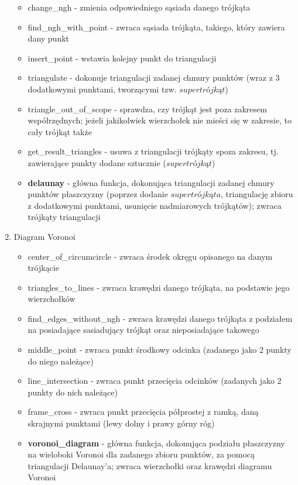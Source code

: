 \documentclass{article}
\begin{document}
\begin{enumerate}
\begin{itemize}
        \item change\_ngh - zmienia odpowiedniego sąsiada danego trójkąta
        \item find\_ngh\_with\_point - zwraca sąsiada trójkąta, takiego, który zawiera dany punkt 
        \item insert\_point - wstawia kolejny punkt do triangulacji
        \item triangulate - dokonuje triangulacji zadanej chmury punktów (wraz z 3 dodatkowymi punktami, tworzącymi tzw. $supertrójkąt$)
        \item triangle\_out\_of\_scope - sprawdza, czy trójkąt jest poza zakresem współrzędnych; jeżeli jakikolwiek wierzchołek nie mieści się w zakresie, to cały trójkąt także
        \item get\_result\_triangles - usuwa z triangulacji trójkąty spoza zakresu, tj. zawierające punkty dodane sztucznie ($supertrójkąt$)
        \item \textbf{delaunay} - główna funkcja, dokonująca triangulacji zadanej chmury punktów płaszczyzny (poprzez dodanie $supertrójkąta$, triangulację zbioru z dodatkowymi punktami, usunięcie nadmiarowych trójkątów); zwraca trójkąty triangulacji
    \end{itemize}
    
    \item Diagram Voronoi
        \begin{itemize}
            \item center\_of\_circumcircle - zwraca środek okręgu opisanego na danym trójkącie
            \item triangles\_to\_lines - zwraca krawędzi danego trójkąta, na podstawie jego wierzchołków
            \item find\_edges\_without\_ngh - zwraca krawędzi danego trójkąta z podziałem na posiadające sasiadujący trójkąt oraz nieposiadające takowego
            \item middle\_point - zwraca punkt środkowy odcinka (zadanego jako 2 punkty do niego należące)
            \item line\_intersection - zwraca punkt przecięcia odcinków (zadanych jako 2 punkty do nich należące)
            \item frame\_cross - zwraca punkt przecięcia półprostej z ramką, daną skrajnymi punktami (lewy dolny i prawy górny róg)
            \item \textbf{voronoi\_diagram} - główna funkcja, dokonująca podziału płaszczyzny na wieloboki Voronoi dla zadanego zbioru punktów, za pomocą triangulacji Delaunay'a; zwraca wierzchołki oraz krawędzi diagramu Voronoi
        \end{itemize}
\end{enumerate}
\end{document}
